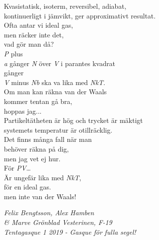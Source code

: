 \documentclass[a6paper,10pt]{article}
\begin{document}
\setlength{\oddsidemargin}{-0.47in}

\begin{center}
\end{center}
\small Kvasistatisk, isoterm, reversibel, adiabat,\\
kontinuerligt i jämvikt, ger approximativt resultat.\\
Ofta antar vi ideal gas,\\
men räcker inte det, \\
vad gör man då?
\vspace{5pt}\\
\textit{P} plus \\
\textit{a} gånger \textit{N} över \textit{V} i parantes kvadrat\\
gånger \\
\textit{V} minus \textit{Nb} ska va lika med \textit{NkT}.\\
Om man kan räkna van der Waals\\
kommer tentan gå bra,\\
hoppas jag...
\vspace{5pt}\\
Partikeltätheten är hög och trycket är mäktigt\\
systemets temperatur är otillräcklig.\\
Det finns många fall när man\\
behöver räkna på dig,\\
men jag vet ej hur.
\vspace{5pt}\\
För \textit{PV}… \\
Är ungefär lika med \textit{NkT},\\
för en ideal gas.\\
men inte van der Waals!

\begin{flushright}
\textit{Felix Bengtsson, Alex Hamben \\ \& Marve Grönblad Vesterinen, F-19 \\Tentagasque 1 2019 - Gasque för fulla segel!}
\end{flushright}

\setlength{\oddsidemargin}{-0.47in}
\end{document}

